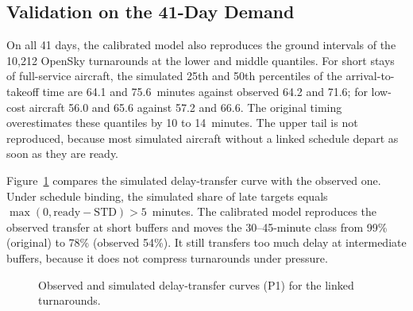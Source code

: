 \subsection{Validation on the 41-Day Demand}
On all 41 days, the calibrated model also reproduces the ground intervals of the 10,212 OpenSky turnarounds at the lower and middle quantiles. For short stays of full-service aircraft, the simulated 25th and 50th percentiles of the arrival-to-takeoff time are 64.1 and 75.6~minutes against observed 64.2 and 71.6; for low-cost aircraft 56.0 and 65.6 against 57.2 and 66.6. The original timing overestimates these quantiles by 10 to 14~minutes. The upper tail is not reproduced, because most simulated aircraft without a linked schedule depart as soon as they are ready.

Figure~\ref{fig:p1sim} compares the simulated delay-transfer curve with the observed one. Under schedule binding, the simulated share of late targets equals $\max(0,\mathrm{ready}-\mathrm{STD})>5$~minutes. The calibrated model reproduces the observed transfer at short buffers and moves the 30--45-minute class from 99\% (original) to 78\% (observed 54\%). It still transfers too much delay at intermediate buffers, because it does not compress turnarounds under pressure.

\begin{figure}[htbp]
\centering
{}
\caption{Observed and simulated delay-transfer curves (P1) for the linked turnarounds.}
\label{fig:p1sim}
\end{figure}

